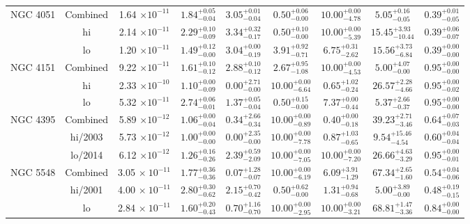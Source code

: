 \documentclass{article}
\begin{document}
\begin{landscape}
\begin{longtable}{ccccccccc}
NGC 4051 & Combined & 1.64 $\times 10^{-11}$ & $1.84^{+0.05}_{-0.04}$ & $3.05^{+0.01}_{-0.04}$ & $0.50^{+0.06}_{-0.00}$ & $10.00^{+0.00}_{-4.78}$ & $5.05^{+0.16}_{-0.05}$ & $0.39^{+0.01}_{-0.05}$ \\ 
& hi & 2.14 $\times 10^{-11}$ & $2.29^{+0.10}_{-0.09}$ & $3.34^{+0.32}_{-0.17}$ & $0.50^{+0.10}_{-0.00}$ & $10.00^{+0.00}_{-5.39}$ & $15.45^{+3.93}_{-10.44}$ & $0.39^{+0.06}_{-0.07}$ \\ 
& lo & 1.20 $\times 10^{-11}$ & $1.49^{+0.12}_{-0.00}$ & $3.04^{+0.00}_{-0.19}$ & $3.91^{+0.92}_{-0.71}$ & $6.75^{+0.31}_{-2.62}$ & $15.56^{+3.73}_{-6.84}$ & $0.39^{+0.00}_{-0.00}$ \\ \hline

NGC 4151 & Combined & 9.22 $\times 10^{-11}$ & $1.61^{+0.10}_{-0.12}$ & $2.88^{+0.10}_{-0.12}$ & $2.67^{+0.95}_{-1.08}$ & $10.00^{+0.00}_{-4.53}$ & $5.00^{+4.07}_{-0.00}$ & $0.95^{+0.00}_{-0.00}$ \\
& hi & 2.33 $\times 10^{-10}$ & $1.10^{+0.00}_{-0.09}$ & $0.00^{+2.71}_{-0.00}$ & $10.00^{+0.00}_{-6.64}$ & $0.65^{+1.02}_{-0.24}$ & $26.57^{+2.28}_{-4.66}$ & $0.95^{+0.00}_{-0.02}$ \\
& lo & 5.32 $\times 10^{-11}$ & $2.74^{+0.06}_{-0.01}$ & $1.37^{+0.05}_{-0.04}$ & $0.50^{+0.15}_{-0.00}$ & $7.37^{+0.00}_{-0.44}$ & $5.37^{+2.66}_{-0.37}$ & $0.95^{+0.00}_{-0.00}$ \\ \hline

NGC 4395 & Combined & 5.89 $\times 10^{-12}$ & $1.06^{+0.00}_{-0.04}$ & $0.34^{+2.66}_{-0.34}$ & $10.00^{+0.00}_{-0.89}$ & $0.40^{+0.00}_{-0.18}$ & $39.23^{+2.71}_{-3.46}$ & $0.64^{+0.07}_{-0.03}$\\
& hi/2003  & 5.73 $\times 10^{-12}$ & $1.00^{+0.00}_{-0.00}$  & $0.00^{+2.35}_{-0.00}$ & $10.00^{+0.00}_{-7.78}$ & $0.87^{+1.03}_{-0.65}$ & $9.54^{+15.46}_{-4.54}$ & $0.60^{+0.04}_{-0.04}$\\ 
& lo/2014 & 6.12 $\times 10^{-12}$ & $1.26^{+0.16}_{-0.26}$ & $2.39^{+0.59}_{-2.09}$ & $10.00^{+0.00}_{-7.05}$ & $10.00^{+0.00}_{-7.20}$ & $26.66^{+4.63}_{-3.29}$ & $0.95^{+0.00}_{-0.01}$\\ \hline

NGC 5548 & Combined & 3.05 $\times~10^{-11}$ & $1.77^{+0.36}_{-0.36}$ & $0.07^{+1.28}_{-0.07}$ & $10.00^{+0.00}_{-6.19}$ & $6.09^{+3.91}_{-1.29}$ & $67.34^{+2.65}_{-1.60}$ & $0.54^{+0.04}_{-0.06}$ \\
& hi/2001 & 4.00 $\times~10^{-11}$ & $2.80^{+0.30}_{-0.62}$ & $2.15^{+0.70}_{-0.42}$ & $0.50^{+0.62}_{-0.00}$ & $1.31^{+0.94}_{-0.68}$ & $5.00^{+3.89}_{-0.00}$ & $0.48^{+0.19}_{-0.15}$ \\
& lo & 2.84 $\times~10^{-11}$ & $1.60^{+0.20}_{-0.43}$ & $0.70^{+1.16}_{-0.70}$ & $10.00^{+0.00}_{-2.95}$ & $10.00^{+0.00}_{-3.21}$ & $68.81^{+1.47}_{-3.36}$ & $0.84^{+0.00}_{-0.00}$ \\ \hline


\end{longtable}
\end{landscape}
\end{document}
